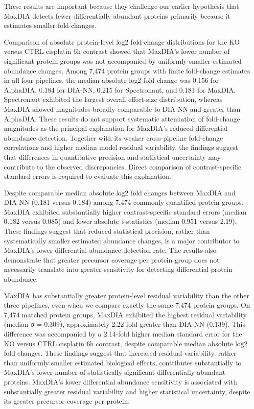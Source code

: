 \documentclass[
  10pt,
]{article}
\begin{document}
These results are important because they challenge our earlier
hypothesis that MaxDIA detects fewer differentially abundant proteins
primarily because it estimates smaller fold changes.

Comparison of absolute protein-level log2 fold-change distributions for
the KO versus CTRL cisplatin 6h contrast showed that MaxDIA's lower
number of significant protein groups was not accompanied by uniformly
smaller estimated abundance changes. Among 7,474 protein groups with
finite fold-change estimates in all four pipelines, the median absolute
log2 fold change was 0.156 for AlphaDIA, 0.184 for DIA-NN, 0.215 for
Spectronaut, and 0.181 for MaxDIA. Spectronaut exhibited the largest
overall effect-size distribution, whereas MaxDIA showed magnitudes
broadly comparable to DIA-NN and greater than AlphaDIA. These results do
not support systematic attenuation of fold-change magnitudes as the
principal explanation for MaxDIA's reduced differential abundance
detection. Together with its weaker cross-pipeline fold-change
correlations and higher median model residual variability, the findings
suggest that differences in quantitative precision and statistical
uncertainty may contribute to the observed discrepancies. Direct
comparison of contrast-specific standard errors is required to evaluate
this explanation.

Despite comparable median absolute log2 fold changes between MaxDIA and
DIA-NN (0.181 versus 0.184) among 7,474 commonly quantified protein
groups, MaxDIA exhibited substantially higher contrast-specific standard
errors (median 0.182 versus 0.085) and lower absolute t-statistics
(median 0.951 versus 2.19). These findings suggest that reduced
statistical precision, rather than systematically smaller estimated
abundance changes, is a major contributor to MaxDIA's lower differential
abundance detection rate. The results also demonstrate that greater
precursor coverage per protein group does not necessarily translate into
greater sensitivity for detecting differential protein abundance.

MaxDIA has substantially greater protein-level residual variability than
the other three pipelines, even when we compare exactly the same 7,474
protein groups. On 7,474 matched protein groups, MaxDIA exhibited the
highest residual variability (median σ = 0.309), approximately 2.22-fold
greater than DIA-NN (0.139). This difference was accompanied by a
2.14-fold higher median standard error for the KO versus CTRL cisplatin
6h contrast, despite comparable median absolute log2 fold changes. These
findings suggest that increased residual variability, rather than
uniformly smaller estimated biological effects, contributes
substantially to MaxDIA's lower number of statistically significant
differentially abundant proteins. MaxDIA's lower differential abundance
sensitivity is associated with substantially greater residual
variability and higher statistical uncertainty, despite its greater
precursor coverage per protein.
\end{document}
